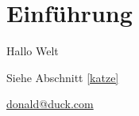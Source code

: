 \documentclass[12pt,ngerman]{scrartcl}
\begin{document}
\tableofcontents

\section{Einführung}

Hallo Welt \label{katze}

\clearpage

Siehe Abschnitt \ref{katze}

\href{mailto:donald@duck.com}{donald@duck.com}
\end{document}
